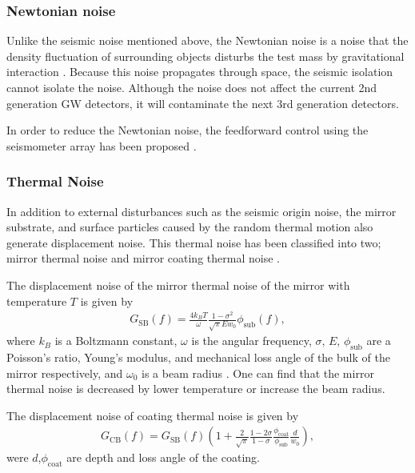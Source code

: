 \subsubsection{Newtonian noise}
Unlike the seismic noise mentioned above, the Newtonian noise is a noise that the density fluctuation of surrounding objects disturbs the test mass by gravitational interaction \cite{harms2015terrestrial}. Because this noise propagates through space, the seismic isolation cannot isolate the noise. Although the noise does not affect the current 2nd generation GW detectors, it will contaminate the next 3rd generation detectors.

In order to reduce the Newtonian noise, the feedforward control using the seismometer array has been proposed \cite{driggers2015noise}.

\subsubsection{Thermal Noise}
In addition to external disturbances such as the seismic origin noise, the mirror substrate, and surface particles caused by the random thermal motion also generate displacement noise. This thermal noise has been classified into two; mirror thermal noise and mirror coating thermal noise \cite{dan2016study}.

The displacement noise of the mirror thermal noise of the mirror with temperature $T$ is given by 
\begin{eqnarray}
  G_{\mathrm{SB}}(f)=\frac{4 k_{B} T}{\omega} \frac{1-\sigma^{2}}{\sqrt{\pi} E w_{0}} \phi_{\mathrm{sub}}(f),
  \label{eq:eq140}
\end{eqnarray}
where $k_{B}$ is a Boltzmann constant, $\omega$ is the angular frequency, $\sigma,\, E,\, \phi_{\mathrm{sub}}$ are a Poisson's ratio, Young's modulus, and mechanical loss angle of the bulk of the mirror respectively, and $\omega_0$ is a beam radius \cite{levin1998internal, numata2003wide}. One can find that the mirror thermal noise is decreased by lower temperature or increase the beam radius.

The displacement noise of coating thermal noise is given by \cite{numata2003wide,harry2002thermal}
\begin{eqnarray}
  G_{\mathrm{CB}}(f)=G_{\mathrm{SB}}(f)\left(1+\frac{2}{\sqrt{\pi}} \frac{1-2 \sigma}{1-\sigma} \frac{\phi_{\mathrm{coat}}}{\phi_{\mathrm{sub}}} \frac{d}{w_{0}}\right), 
\end{eqnarray}
were $d$,$\phi_{\mathrm{coat}}$ are depth and loss angle of the coating.


